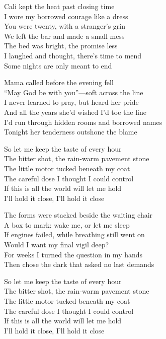 \begin{lyrics}
Cali kept the heat past closing time\\
I wore my borrowed courage like a dress\\
You were twenty, with a stranger’s grin\\
We left the bar and made a small mess\\
The bed was bright, the promise less\\
I laughed and thought, there’s time to mend\\
Some nights are only meant to end

Mama called before the evening fell\\
“May God be with you”—soft across the line\\
I never learned to pray, but heard her pride\\
And all the years she’d wished I’d toe the line\\
I’d run through hidden rooms and borrowed names\\
Tonight her tenderness outshone the blame

So let me keep the taste of every hour\\
The bitter shot, the rain-warm pavement stone\\
The little motor tucked beneath my coat\\
The careful dose I thought I could control\\
If this is all the world will let me hold\\
I’ll hold it close, I’ll hold it close

The forms were stacked beside the waiting chair\\
A box to mark: wake me, or let me sleep\\
If engines failed, while breathing still went on\\
Would I want my final vigil deep?\\
For weeks I turned the question in my hands\\
Then chose the dark that asked no last demands

So let me keep the taste of every hour\\
The bitter shot, the rain-warm pavement stone\\
The little motor tucked beneath my coat\\
The careful dose I thought I could control\\
If this is all the world will let me hold\\
I’ll hold it close, I’ll hold it close


\end{lyrics}
